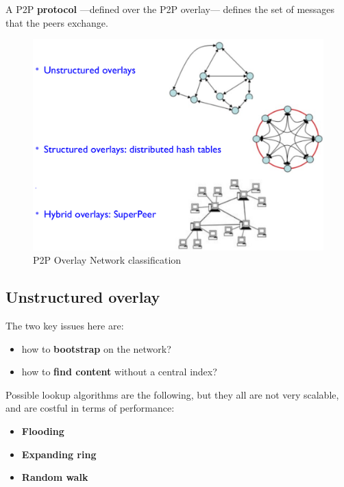 A P2P \textbf{protocol} ---defined over the P2P overlay--- defines the set of messages that the peers exchange.

\begin{figure}[htbp]
   \centering
   \includegraphics{images/overlayClassification.png}
   \caption{P2P Overlay Network classification}
   \label{fig:overlayClassification}
\end{figure}

\subsection{Unstructured overlay}
\begin{paracol}{2}
   \colfill
   The two key issues here are:
   \begin{itemize}
   \item
   how to \textbf{bootstrap} on the network?
   \item
   how to \textbf{find content} without a central index?
\end{itemize}
\colfill
\switchcolumn
Possible lookup algorithms are the following, but they all are not very scalable, and are costful in terms of performance:
\begin{itemize}
   \item \textbf{Flooding}
   \item \textbf{Expanding ring}
   \item \textbf{Random walk}
\end{itemize}
\end{paracol}

